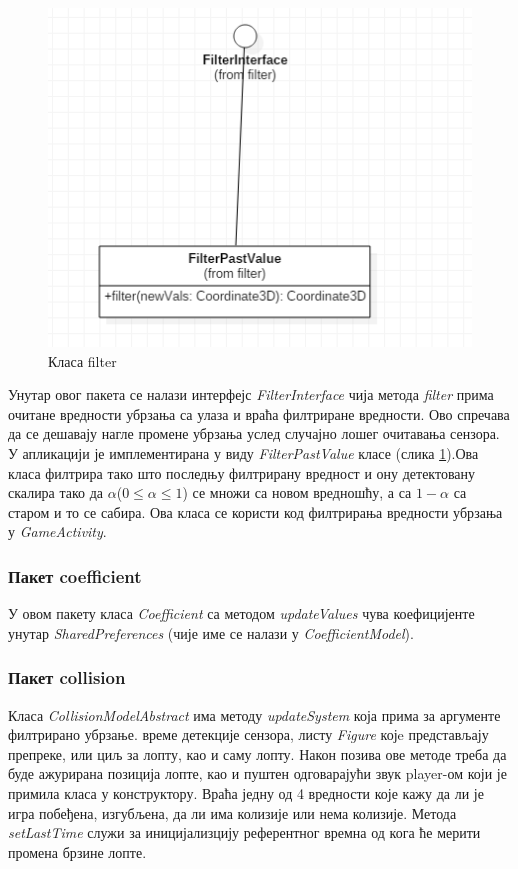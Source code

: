 \begin{figure}[htb!]
\begin{center}
\includegraphics[scale=.6]{pictures/UML/class/filter}
\caption{Класа filter}\label{fig:umlClassFilter}
\end{center}
\end{figure}

Унутар овог пакета се налази интерфејс \emph{FilterInterface} чија метода \emph{filter} прима очитане вредности убрзања са улаза и враћа филтриране вредности. Ово спречава да се дешавају нагле промене убрзања услед случајно лошег очитавања сензора. У апликацији је имплементирана у виду \emph{FilterPastValue} класе (слика \ref{fig:umlClassFilter}).Ова класа филтрира тако што последњу филтрирану вредност и ону детектовану скалира тако да $\alpha$($0 \leq \alpha \leq 1$) се множи са новом вредношћу, а са $1-\alpha$ са старом и то се сабира. Ова класа се користи код филтрирања вредности убрзања у \emph{GameActivity}. 

\subsubsection{Пакет coefficient}
У овом пакету класа \emph{Coefficient} са методом \emph{updateValues} чува коефицијенте унутар \emph{SharedPreferences} (чије име се налази у \emph{CoefficientModel}). 
\subsubsection{Пакет collision}
Класа \emph{CollisionModelAbstract} има методу \emph{updateSystem} која прима за аргументе филтрирано убрзање. време детекције сензора, листу  \emph{Figure} којe представљају препреке, или циљ за лопту, као и саму лопту. Након позива ове методе треба да буде ажурирана позиција лопте, као и пуштен одговарајући звук player-ом који је примила класа у конструктору. Враћа једну од 4 вредности које кажу да ли је игра побеђена, изгубљена, да ли има колизије или нема колизије. Метода \emph{setLastTime} служи за иницијализцију референтног времна од кога ће мерити промена брзине лопте.

